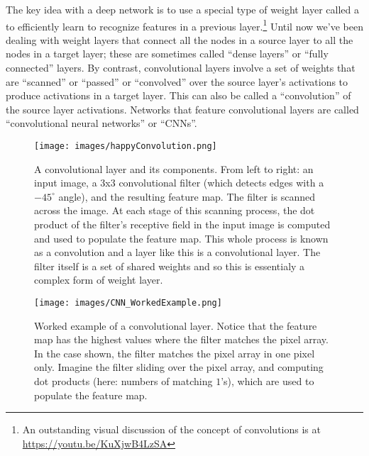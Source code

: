
The key idea with a deep network is to use a special type of weight layer called a  to efficiently learn to recognize features in a previous layer.\footnote{An outstanding visual discussion of the concept of convolutions is at \url{https://youtu.be/KuXjwB4LzSA}} Until now we've been dealing with weight layers that connect all the nodes in a source layer to all the nodes in a target layer; these are sometimes called ``dense layers'' or ``fully connected'' layers. By contrast, convolutional layers involve a set of weights that are ``scanned'' or ``passed'' or ``convolved'' over the source layer's activations to produce activations in a target layer. This can also be called a ``convolution'' of the source layer activations. Networks that feature convolutional layers are called ``convolutional neural networks'' or ``CNNs''.

\begin{figure}[h]
\centering
\texttt{[image: images/happyConvolution.png]}
\caption[Soraya Boza, adapting this image from User Cecbur, \url{https://commons.wikimedia.org/wiki/File:Convolutional_Neural_Network_NeuralNetworkFilter.gif}, with labels added by Jeff Yoshimi.]{A convolutional layer and its components. From left to right: an input image, a 3x3 convolutional filter (which detects edges with a $-45^\circ$ angle), and the resulting feature map. The filter is scanned across the image. At each stage of this scanning process, the dot product of the filter's receptive field in the input image is computed and used to populate the feature map. This whole process is known as a convolution and a layer like this is a convolutional layer. The filter itself is a set of shared weights and so this is essentialy a complex form of weight layer.}
\label{cnn_filter}
\end{figure}

\begin{figure}[h]
\centering
\texttt{[image: images/CNN\_WorkedExample.png]}
\caption[Jeff Yoshimi]{Worked example of a convolutional layer. Notice that the feature map has the highest values where the filter matches the pixel array. In the case shown, the filter matches the pixel array in one pixel only. Imagine the filter sliding over the pixel array, and computing dot products (here: numbers of matching $1$'s), which are used to populate the feature map.}
\label{cnn_workedExample}
\end{figure}

